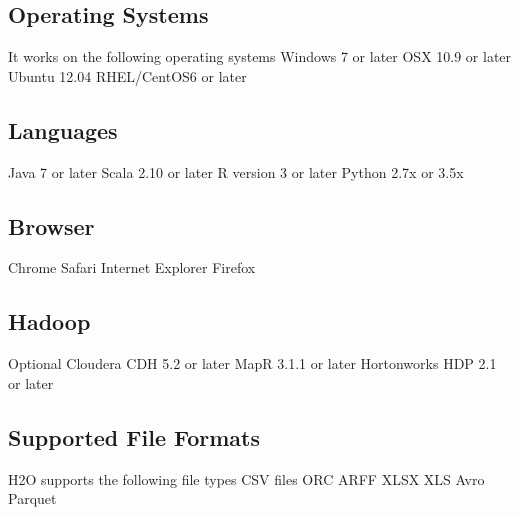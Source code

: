 \documentclass[9pt,twocolumn,twoside]{../../styles/osajnl}
\begin{document}
\subsection{Operating Systems}

It works on the following operating systems 
\newline Windows 7 or later
\newline OSX 10.9 or later
\newline Ubuntu 12.04
\newline RHEL/CentOS6 or later\cite{www-h2o-requirements}

\subsection{Languages}

 Java 7 or later
\newline Scala 2.10 or later
\newline R version 3 or later
\newline Python 2.7x or 3.5x\cite{www-h2o-requirements}
 
\subsection{Browser}

 Chrome
\newline Safari
\newline Internet Explorer
\newline Firefox\cite{www-h2o-requirements}

\subsection{ Hadoop}
 Optional Cloudera CDH 5.2 or later
\newline MapR 3.1.1 or later
\newline Hortonworks HDP 2.1 or later\cite{www-h2o-requirements}


\subsection{Supported File Formats}

H2O supports the following file types
\newline CSV files
\newline ORC
\newline ARFF
\newline XLSX
\newline XLS
\newline Avro
\newline Parquet\cite{www-h2o-requirements}
\end{document}

